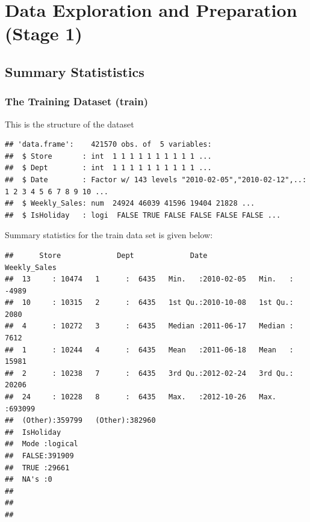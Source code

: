 \documentclass[]{article}
\begin{document}
\pagebreak
\hfill \break
\hfill \break
\hfill \break
\hfill \break
\hfill \break
\hfill \break
\hfill \break
\hfill \break
\hfill \break
\hfill \break
\hfill \break
\hfill \break
\hfill \break
\hfill \break
\hfill \break
\hfill \break
\hfill \break
\hfill \break
\hfill \break
\hfill \break

\section{Data Exploration and Preparation (Stage
1)}\label{data-exploration-and-preparation-stage-1}

\subsection{Summary Statististics}\label{summary-statististics}

\subsubsection{The Training Dataset
(train)}\label{the-training-dataset-train}

This is the structure of the dataset

\begin{verbatim}
## 'data.frame':    421570 obs. of  5 variables:
##  $ Store       : int  1 1 1 1 1 1 1 1 1 1 ...
##  $ Dept        : int  1 1 1 1 1 1 1 1 1 1 ...
##  $ Date        : Factor w/ 143 levels "2010-02-05","2010-02-12",..: 1 2 3 4 5 6 7 8 9 10 ...
##  $ Weekly_Sales: num  24924 46039 41596 19404 21828 ...
##  $ IsHoliday   : logi  FALSE TRUE FALSE FALSE FALSE FALSE ...
\end{verbatim}

Summary statistics for the train data set is given below:

\begin{verbatim}
##      Store             Dept             Date             Weekly_Sales   
##  13     : 10474   1      :  6435   Min.   :2010-02-05   Min.   : -4989  
##  10     : 10315   2      :  6435   1st Qu.:2010-10-08   1st Qu.:  2080  
##  4      : 10272   3      :  6435   Median :2011-06-17   Median :  7612  
##  1      : 10244   4      :  6435   Mean   :2011-06-18   Mean   : 15981  
##  2      : 10238   7      :  6435   3rd Qu.:2012-02-24   3rd Qu.: 20206  
##  24     : 10228   8      :  6435   Max.   :2012-10-26   Max.   :693099  
##  (Other):359799   (Other):382960                                        
##  IsHoliday      
##  Mode :logical  
##  FALSE:391909   
##  TRUE :29661    
##  NA's :0        
##                 
##                 
## 
\end{verbatim}
\end{document}
